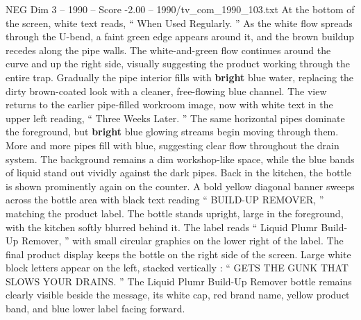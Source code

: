 \begin{textsample}{NEG Dim 3 – 1990 – Score -2.00 – 1990/tv\_com\_1990\_103.txt}
At the bottom of the screen, white text reads, “ When Used Regularly. ” As the white flow spreads through the U-bend, a faint green edge appears around it, and the brown buildup recedes along the pipe walls.
The white-and-green flow continues around the curve and up the right side, visually suggesting the product working through the entire trap.
Gradually the pipe interior fills with \textbf{bright} blue water, replacing the dirty brown-coated look with a cleaner, free-flowing blue channel.
The view returns to the earlier pipe-filled workroom image, now with white text in the upper left reading, “ Three Weeks Later. ” The same horizontal pipes dominate the foreground, but \textbf{bright} blue glowing streams begin moving through them.
More and more pipes fill with blue, suggesting clear flow throughout the drain system.
The background remains a dim workshop-like space, while the blue bands of liquid stand out vividly against the dark pipes.
Back in the kitchen, the bottle is shown prominently again on the counter.
A bold yellow diagonal banner sweeps across the bottle area with black text reading “ BUILD-UP REMOVER, ” matching the product label.
The bottle stands upright, large in the foreground, with the kitchen softly blurred behind it.
The label reads “ Liquid Plumr Build-Up Remover, ” with small circular graphics on the lower right of the label.
The final product display keeps the bottle on the right side of the screen.
Large white block letters appear on the left, stacked vertically : “ GETS THE GUNK THAT SLOWS YOUR DRAINS. ” The Liquid Plumr Build-Up Remover bottle remains clearly visible beside the message, its white cap, red brand name, yellow product band, and blue lower label facing forward.

\end{textsample}
